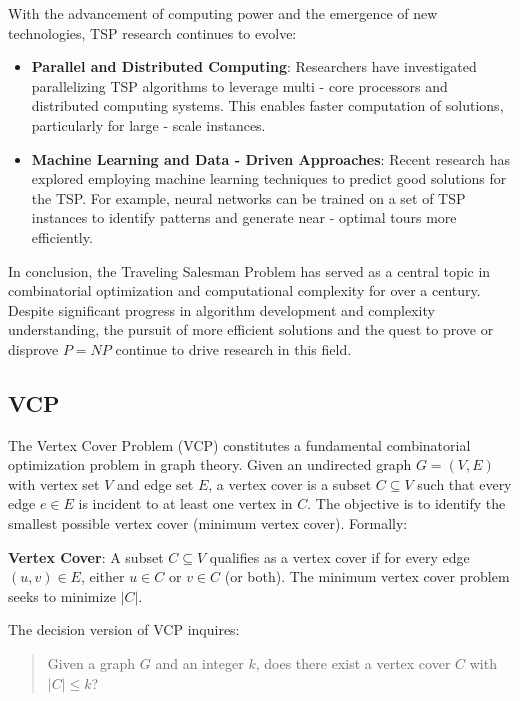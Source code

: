 \documentclass[acmsmall]{acmart}
\begin{document}
	\hspace{1.2em}With the advancement of computing power and the emergence of new technologies, TSP research continues to evolve:
	\begin{itemize}
		\item \textbf{Parallel and Distributed Computing}: Researchers have investigated parallelizing TSP algorithms to leverage multi - core processors and distributed computing systems. This enables faster computation of solutions, particularly for large - scale instances.
		
		\item \textbf{Machine Learning and Data - Driven Approaches}: Recent research has explored employing machine learning techniques to predict good solutions for the TSP. For example, neural networks can be trained on a set of TSP instances to identify patterns and generate near - optimal tours more efficiently.
	\end{itemize}
	
	In conclusion, the Traveling Salesman Problem has served as a central topic in combinatorial optimization and computational complexity for over a century. Despite significant progress in algorithm development and complexity understanding, the pursuit of more efficient solutions and the quest to prove or disprove \(P = NP\) continue to drive research in this field.
	
	\subsection{VCP}
	
	The Vertex Cover Problem (VCP) constitutes a fundamental combinatorial optimization problem in graph theory\cite{2020Parameterized}. Given an undirected graph \( G = (V, E) \) with vertex set \( V \) and edge set \( E \), a vertex cover is a subset \( C \subseteq V \) such that every edge \( e \in E \) is incident to at least one vertex in \( C \). The objective is to identify the smallest possible vertex cover (minimum vertex cover). Formally:
	
	\textbf{Vertex Cover}:
	A subset \( C \subseteq V \) qualifies as a vertex cover if for every edge \( (u, v) \in E \), either \( u \in C \) or \( v \in C \) (or both). The minimum vertex cover problem seeks to minimize \( |C| \).
	
	The decision version of VCP inquires:
	\begin{quote}
		Given a graph \( G \) and an integer \( k \), does there exist a vertex cover \( C \) with \( |C| \leq k \)?
	\end{quote}
	
\end{document}
